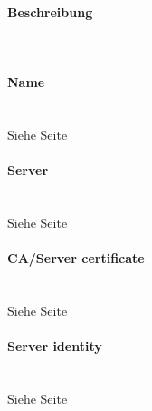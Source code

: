 \begin{minipage}[t]{0.5\textwidth}
\vspace{0pt}
\paragraph{Beschreibung}\mbox{}\\
\paragraph{Name}\mbox{}\\
Siehe Seite \pageref{name} \\

\paragraph{Server}\mbox{}\\
Siehe Seite \pageref{server} \\

\paragraph{CA/Server certificate}\mbox{}\\
Siehe Seite \pageref{servercertificate} \\

\paragraph{Server identity}\mbox{}\\
Siehe Seite \pageref{serveridentitiy} \\

\end{minipage}
\newpage

